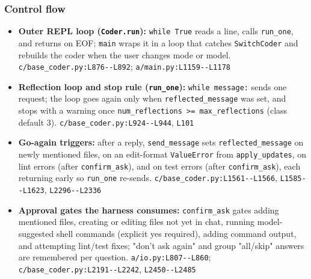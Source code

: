 \subsubsection*{Control flow}
\begin{itemize}
\item \textbf{Outer REPL loop (\texttt{Coder.\allowbreak{}run}):} \texttt{while True} reads a line, calls \texttt{run\_\allowbreak{}one}, and returns on EOF; \texttt{main} wraps it in a loop that catches \texttt{SwitchCoder} and rebuilds the coder when the user changes mode or model. \texttt{c/\allowbreak{}base\_\allowbreak{}coder.\allowbreak{}py:\allowbreak{}L876-\allowbreak{}-\allowbreak{}L892}; \texttt{a/\allowbreak{}main.\allowbreak{}py:\allowbreak{}L1159-\allowbreak{}-\allowbreak{}L1178}
\item \textbf{Reflection loop and stop rule (\texttt{run\_\allowbreak{}one}):} \texttt{while message:\allowbreak{}} sends one request; the loop goes again only when \texttt{reflected\_\allowbreak{}message} was set, and stops with a warning once \texttt{num\_\allowbreak{}reflections >= max\_\allowbreak{}reflections} (class default 3). \texttt{c/\allowbreak{}base\_\allowbreak{}coder.\allowbreak{}py:\allowbreak{}L924-\allowbreak{}-\allowbreak{}L944}, \texttt{L101}
\item \textbf{Go-again triggers:} after a reply, \texttt{send\_\allowbreak{}message} sets \texttt{reflected\_\allowbreak{}message} on newly mentioned files, on an edit-format \texttt{ValueError} from \texttt{apply\_\allowbreak{}updates}, on lint errors (after \texttt{confirm\_\allowbreak{}ask}), and on test errors (after \texttt{confirm\_\allowbreak{}ask}), each returning early so \texttt{run\_\allowbreak{}one} re-sends. \texttt{c/\allowbreak{}base\_\allowbreak{}coder.\allowbreak{}py:\allowbreak{}L1561-\allowbreak{}-\allowbreak{}L1566}, \texttt{L1585-\allowbreak{}-\allowbreak{}L1623}, \texttt{L2296-\allowbreak{}-\allowbreak{}L2336}
\item \textbf{Approval gates the harness consumes:} \texttt{confirm\_\allowbreak{}ask} gates adding mentioned files, creating or editing files not yet in chat, running model-suggested shell commands (explicit yes required), adding command output, and attempting lint/test fixes; "don't ask again" and group "all/skip" answers are remembered per question. \texttt{a/\allowbreak{}io.\allowbreak{}py:\allowbreak{}L807-\allowbreak{}-\allowbreak{}L860}; \texttt{c/\allowbreak{}base\_\allowbreak{}coder.\allowbreak{}py:\allowbreak{}L2191-\allowbreak{}-\allowbreak{}L2242}, \texttt{L2450-\allowbreak{}-\allowbreak{}L2485}

\end{itemize}
